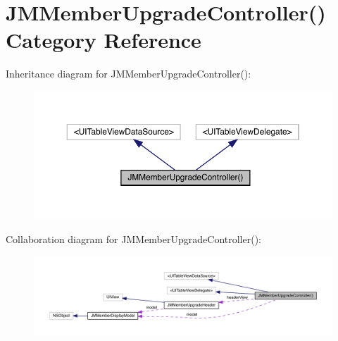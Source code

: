 \hypertarget{category_j_m_member_upgrade_controller_07_08}{}\section{J\+M\+Member\+Upgrade\+Controller() Category Reference}
\label{category_j_m_member_upgrade_controller_07_08}


Inheritance diagram for J\+M\+Member\+Upgrade\+Controller()\+:\nopagebreak
\begin{figure}[H]
\begin{center}
\leavevmode
\includegraphics[width=350pt]{category_j_m_member_upgrade_controller_07_08__inherit__graph}
\end{center}
\end{figure}


Collaboration diagram for J\+M\+Member\+Upgrade\+Controller()\+:\nopagebreak
\begin{figure}[H]
\begin{center}
\leavevmode
\includegraphics[width=350pt]{category_j_m_member_upgrade_controller_07_08__coll__graph}
\end{center}
\end{figure}
